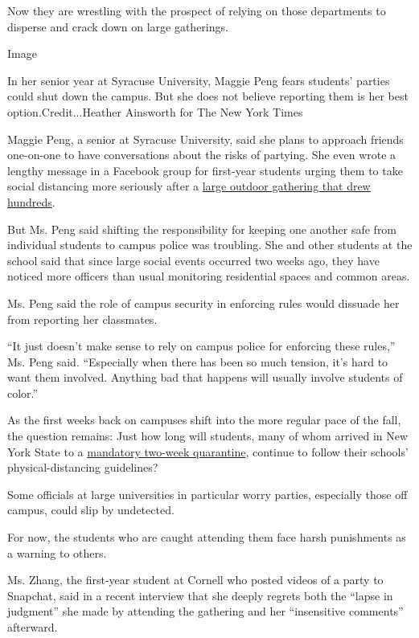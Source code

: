 Now they are wrestling with the prospect of relying on those departments
to disperse and crack down on large gatherings.

Image

In her senior year at Syracuse University, Maggie Peng fears students'
parties could shut down the campus. But she does not believe reporting
them is her best option.Credit...Heather Ainsworth for The New York
Times

Maggie Peng, a senior at Syracuse University, said she plans to approach
friends one-on-one to have conversations about the risks of partying.
She even wrote a lengthy message in a Facebook group for first-year
students urging them to take social distancing more seriously after a
\href{http://dailyorange.com/2020/08/videos-surface-showing-100-syracuse-university-students-gathering-on-campus-not-social-distancing/}{large
outdoor gathering that drew hundreds}.

But Ms. Peng said shifting the responsibility for keeping one another
safe from individual students to campus police was troubling. She and
other students at the school said that since large social events
occurred two weeks ago, they have noticed more officers than usual
monitoring residential spaces and common areas.

Ms. Peng said the role of campus security in enforcing rules would
dissuade her from reporting her classmates.

``It just doesn't make sense to rely on campus police for enforcing
these rules,'' Ms. Peng said. ``Especially when there has been so much
tension, it's hard to want them involved. Anything bad that happens will
usually involve students of color.''

As the first weeks back on campuses shift into the more regular pace of
the fall, the question remains: Just how long will students, many of
whom arrived in New York State to a
\href{https://www.nytimes3xbfgragh.onion/2020/08/18/nyregion/college-reopening-quarantine-coronavirus.html}{mandatory
two-week quarantine}, continue to follow their schools'
physical-distancing guidelines?

Some officials at large universities in particular worry parties,
especially those off campus, could slip by undetected.

For now, the students who are caught attending them face harsh
punishments as a warning to others.

Ms. Zhang, the first-year student at Cornell who posted videos of a
party to Snapchat, said in a recent interview that she deeply regrets
both the ``lapse in judgment'' she made by attending the gathering and
her ``insensitive comments'' afterward.

